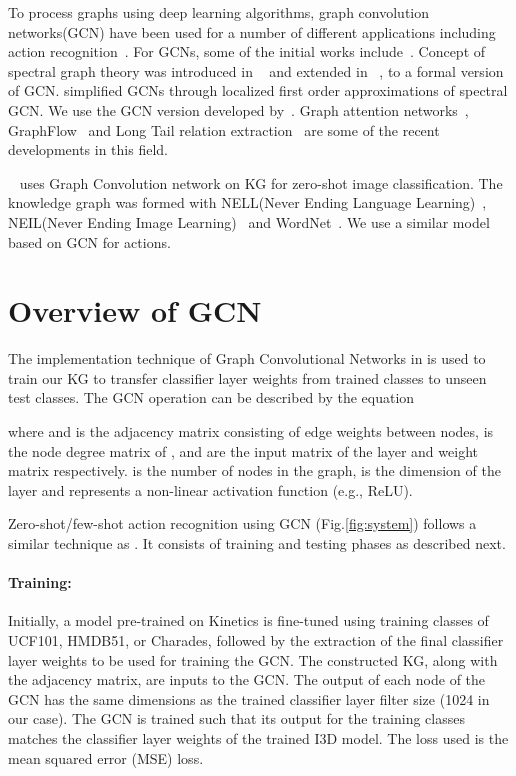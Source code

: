To process graphs using deep learning algorithms, graph convolution networks(GCN) have been used for a number of different applications including action recognition~\cite{yan2018spatial,ghosh2020stacked}. For GCNs, some of the initial works include~\cite{atwood2016diffusion,duvenaud2015convolutional,henaff2015deep}. Concept of spectral graph theory was introduced in ~\cite{hammond2011wavelets} and extended in ~\cite{defferrard2016convolutional}, to a formal version of GCN. \cite{kipf2016semi} simplified GCNs through localized first order approximations of spectral GCN. We use the GCN version developed by~\cite{kipf2016semi}.
Graph attention networks~\cite{velivckovic2017graph}, GraphFlow~\cite{ji2019graphflow} and Long Tail relation extraction~\cite{zhang2019long} are some of the recent developments in this field.

~\cite{wang2018zero} uses Graph Convolution network on KG for zero-shot image classification. The knowledge graph was formed with NELL(Never Ending Language Learning)~\cite{carlson2010toward}, NEIL(Never Ending Image Learning)~\cite{chen2013neil} and WordNet~\cite{miller1995wordnet}. We use a similar model based on GCN for actions.
 \section{Overview of GCN}
\label{sec:gcn_o}

The implementation technique of Graph Convolutional Networks in \cite{kipf2016semi} is used to train our KG to transfer classifier layer weights from trained classes to unseen test classes. The GCN operation can be described by the equation

where  and  is the adjacency matrix consisting of edge weights between nodes,  is the node degree matrix of ,  and  are the  input matrix of the  layer and  weight matrix respectively.  is the number of nodes in the graph,  is the dimension of the  layer and  represents a non-linear activation function (e.g., ReLU).


Zero-shot/few-shot action recognition using GCN (Fig.\ref{fig:system}) follows a similar technique as \cite{wang2018zero}. It consists of training and testing phases as described next.


\paragraph{\bf Training:}
Initially, a model pre-trained on Kinetics is fine-tuned using training classes of UCF101, HMDB51, or Charades, followed by the extraction of the final classifier layer weights to be used for training the GCN.
The constructed KG, along with the adjacency matrix, are inputs to the GCN. The output of each node of the GCN has the same dimensions as the trained classifier layer filter size (1024 in our case). The GCN is trained such that its output for the training classes matches the classifier layer weights of the trained I3D model. The loss used is the mean squared error (MSE) loss. 

